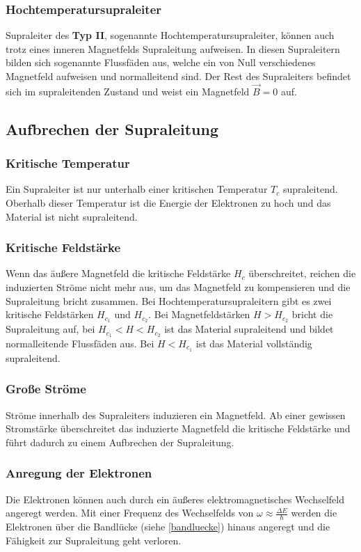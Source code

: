 \documentclass[12pt]{article}
\begin{document}
\subsubsection{Hochtemperatursupraleiter}
Supraleiter des \textbf{Typ II}, sogenannte Hochtemperatursupraleiter, können auch trotz eines inneren Magnetfelds Supraleitung aufweisen. In diesen Supraleitern bilden sich sogenannte Flussfäden aus, welche ein von Null verschiedenes Magnetfeld aufweisen und normalleitend sind. Der Rest des Supraleiters befindet sich im supraleitenden Zustand und weist ein Magnetfeld $\vec B=0$ auf.

\subsection{Aufbrechen der Supraleitung}
\subsubsection{Kritische Temperatur}
Ein Supraleiter ist nur unterhalb einer kritischen Temperatur $T_c$ supraleitend. Oberhalb dieser Temperatur ist die Energie der Elektronen zu hoch und das Material ist nicht supraleitend.
\subsubsection{Kritische Feldstärke}
Wenn das äußere Magnetfeld die kritische Feldstärke $H_c$ überschreitet, reichen die induzierten Ströme nicht mehr aus, um das Magnetfeld zu kompensieren und die Supraleitung bricht zusammen. Bei Hochtemperatursupraleitern gibt es zwei kritische Feldstärken $H_{c_1}$ und  $H_{c_2}$. Bei Magnetfeldstärken $H>H_{c_2}$ bricht die Supraleitung auf, bei $H_{c_1}<H<H_{c_2}$ ist das Material supraleitend und bildet normalleitende Flussfäden aus. Bei $H<H_{c_1}$ ist das Material vollständig supraleitend.
\subsubsection{Große Ströme}
Ströme innerhalb des Supraleiters induzieren ein Magnetfeld. Ab einer gewissen Stromstärke überschreitet das induzierte Magnetfeld die kritische Feldstärke und führt dadurch zu einem Aufbrechen der Supraleitung.
\subsubsection{Anregung der Elektronen}
Die Elektronen können auch durch ein äußeres elektromagnetisches Wechselfeld angeregt werden. Mit einer Frequenz des Wechselfelds von $\omega\approx\frac{\Delta E}{\hbar}$ werden die Elektronen über die Bandlücke (siehe \ref{bandluecke}) hinaus angeregt und die Fähigkeit zur Supraleitung geht verloren.
\end{document}
